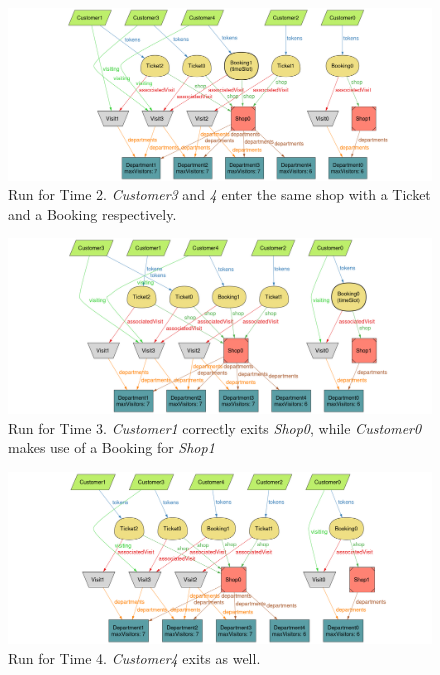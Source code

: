 \begin{figure}[H]
    \centering
    \includegraphics[height=0.25\textheight]{Images/Alloy/5Customers_v1_t2.png}
    \caption{Run for Time 2. \emph{Customer3} and \emph{4} enter the same shop with a Ticket and a Booking respectively.}
\end{figure}
\begin{figure}[H]
    \centering
    \includegraphics[height=0.25\textheight]{Images/Alloy/5Customers_v1_t3.png}
    \caption{Run for Time 3. \emph{Customer1} correctly exits \emph{Shop0}, while \emph{Customer0} makes use of a Booking for \emph{Shop1}}
\end{figure}
\begin{figure}[H]
    \centering
    \includegraphics[height=0.25\textheight]{Images/Alloy/5Customers_v1_t4.png}
    \caption{Run for Time 4. \emph{Customer4} exits as well.}
\end{figure}


